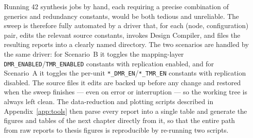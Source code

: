 Running 42 synthesis jobs by hand, each requiring a precise combination of
generics and redundancy constants, would be both tedious and unreliable. The
sweep is therefore fully automated by a driver that, for each (node,
configuration) pair, edits the relevant source constants, invokes Design
Compiler, and files the resulting reports into a clearly named directory. The
two scenarios are handled by the same driver: for Scenario~B it toggles the
mapping-layer \texttt{DMR\_ENABLED}/\texttt{TMR\_ENABLED} constants with
replication enabled, and for Scenario~A it toggles the per-unit
\texttt{*\_DMR\_EN}/\texttt{*\_TMR\_EN} constants with replication disabled. The
source files it edits are backed up before any change and restored when the
sweep finishes --- even on error or interruption --- so the working tree is
always left clean. The data-reduction and plotting scripts described in
Appendix~\ref{app:tools} then parse every report into a single table and
generate the figures and tables of the next chapter directly from it, so that
the entire path from raw reports to thesis figures is reproducible by re-running
two scripts.
